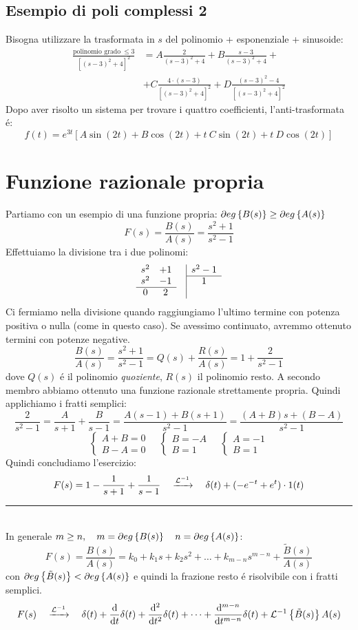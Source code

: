 \documentclass[../main.tex]{subfiles}
\begin{document}
	\subsection{Esempio di poli complessi 2}
	Bisogna utilizzare la trasformata in $ s $ del polinomio + esponenziale + sinusoide:
	\begin{align*}
		\frac{\text{polinomio grado}\: \leq 3}{[(s-3)^2 + 4]^2} &= A \frac{2}{(s-3)^2 + 4} + B \frac{s - 3}{(s-3)^2 + 4} +\\
		&+ C \frac{4 \cdot (s-3)}{[(s-3)^2 + 4]^2} + D \frac{(s - 3)^2 - 4}{[(s-3)^2 + 4]^2}
	\end{align*}
	Dopo aver risolto un sistema per trovare i quattro coefficienti, l'anti-trasformata \'{e}:
	\[ f(t) = e^{3t} [A \sin(2t) + B \cos(2t) + t\ C \sin(2t) + t\ D \cos(2t)] \]
	\section{Funzione razionale propria}
	Partiamo con un esempio di una funzione propria: $ \partial eg \left\lbrace B(s) \right\rbrace \geq \partial eg \left\lbrace A(s) \right\rbrace $
	\[ F(s) = \frac{B(s)}{A(s)} = \frac{s^2+1}{s^2-1} \]
	Effettuiamo la divisione tra i due polinomi:
	\[ 
	\begin{array}{ccc|c}
	s^2 & +1 & & s^2-1\\ \cline{4-4}
	s^2 & -1 & & 1\\ \cline{1-2}
	0 	& 2  & &
	\end{array}
	 \]
	Ci fermiamo nella divisione quando raggiungiamo l'ultimo termine con potenza positiva o nulla (come in questo caso). Se avessimo continuato, avremmo ottenuto termini con potenze negative.
	\[ \frac{B(s)}{A(s)} = \frac{s^2+1}{s^2-1} = Q(s) + \frac{R(s)}{A(s)} = 1 + \frac{2}{s^2-1} \]
	dove $ Q(s) $ \'{e} il polinomio \textit{quoziente}, $ R(s) $ il polinomio resto.
	A secondo membro abbiamo ottenuto una funzione razionale strettamente propria. Quindi applichiamo i fratti semplici:
	\[ \frac{2}{s^2-1} = \frac{A}{s+1} + \frac{B}{s-1} = \frac{A(s-1) + B(s+1)}{s^2-1} = \frac{(A+B)s + (B-A)}{s^2-1} \]
	\[ 
		\begin{cases} A + B = 0\\B - A = 0\end{cases} \quad
		\begin{cases} B = -A\\ B = 1\end{cases} \quad
		\begin{cases} A = -1\\ B = 1\end{cases}
	\]
	Quindi concludiamo l'esercizio:
	\[ F(s) = 1 - \frac{1}{s+1} + \frac{1}{s-1} \quad \xrightarrow{\mathcal{L}^{-1}} \quad  \delta(t) + (-e^{-t} + e^t) \cdot 1(t) \]
	\rule{\linewidth}{.4pt}
	\smallskip\\
	In generale $ m \geq n, \quad m = \partial eg \left\lbrace B(s) \right\rbrace \quad n = \partial eg \left\lbrace A(s) \right\rbrace $:
	\[ F(s) = \frac{B(s)}{A(s)} = k_0 + k_1 s + k_2 s^2 + \dots + k_{m-n} s^{m-n} + \frac{\tilde{B}(s)}{A(s)} \]
	con $ \partial eg \left\lbrace \tilde{B}(s) \right\rbrace < \partial eg \left\lbrace A(s) \right\rbrace $ e quindi la frazione resto \'{e} risolvibile con i fratti semplici.
	\[ F(s) \quad \xrightarrow{\mathcal{L}^{-1}} \quad \delta(t) + \frac{\mathrm{d} }{\mathrm{d} t} \delta(t) + \frac{\mathrm{d} ^2}{\mathrm{d} t^2} \delta(t) + \dots + \frac{\mathrm{d} ^{m-n}}{\mathrm{d} t^{m-n}} \delta(t) + \mathcal{L}^{-1} \left\lbrace \tilde{B}(s) \right\rbrace{A(s)} \]
\end{document}
